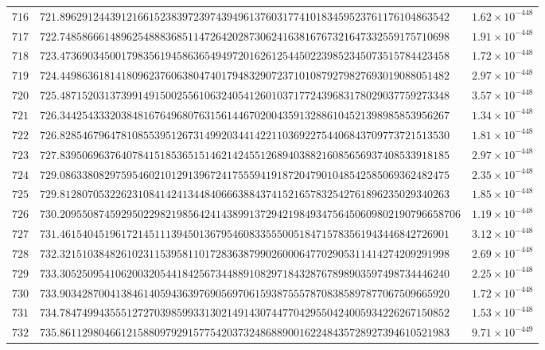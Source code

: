 \documentclass[12pt,reqno]{amsart}
\theoremstyle{remark}
\begin{document}
\begin{longtable}{clc}
$716$ & $721.8962912443912166152383972397439496137603177410183459523761176104863542$ & $1.62\times 10^{-448}$ \\
$717$ & $722.7485866614896254888368511472642028730624163816767321647332559175710698$ & $1.91\times 10^{-448}$ \\
$718$ & $723.4736903450017983561945863654949720162612544502239852345073515784423458$ & $1.72\times 10^{-448}$ \\
$719$ & $724.4498636181418096237606380474017948329072371010879279827693019088051482$ & $2.97\times 10^{-448}$ \\
$720$ & $725.4871520313739914915002556106324054126010371772439683178029037759273348$ & $3.57\times 10^{-448}$ \\
$721$ & $726.3442543332038481676496807631561446702004359132886104521398985853956267$ & $1.34\times 10^{-448}$ \\
$722$ & $726.8285467964781085539512673149920344142211036922754406843709773721513530$ & $1.81\times 10^{-448}$ \\
$723$ & $727.8395069637640784151853651514621424551268940388216085656937408533918185$ & $2.97\times 10^{-448}$ \\
$724$ & $729.0863380829759546021012913967241755594191872047901048542585069362482475$ & $2.35\times 10^{-448}$ \\
$725$ & $729.8128070532262310841424134484066638843741521657832542761896235029340263$ & $1.85\times 10^{-448}$ \\
$726$ & $730.209550874592950229821985642414389913729421984934756450609802190796658706$ & $1.19\times 10^{-448}$ \\
$727$ & $731.4615404519617214511139450136795460833555005184715783561943446842726901$ & $3.12\times 10^{-448}$ \\
$728$ & $732.3215103848261023115395811017283638799026000647702905311414274209291998$ & $2.69\times 10^{-448}$ \\
$729$ & $733.3052509541062003205441842567344889108297184328767898903597498734446240$ & $2.25\times 10^{-448}$ \\
$730$ & $733.9034287004138461405943639769056970615938755578708385897877067509665920$ & $1.72\times 10^{-448}$ \\
$731$ & $734.7847499435551272703985993313021491430744770429550424005934226267150852$ & $1.53\times 10^{-448}$ \\
$732$ & $735.8611298046612158809792915775420373248688900162248435728927394610521983$ & $9.71\times 10^{-449}$ \\

\end{longtable}
\end{document}
